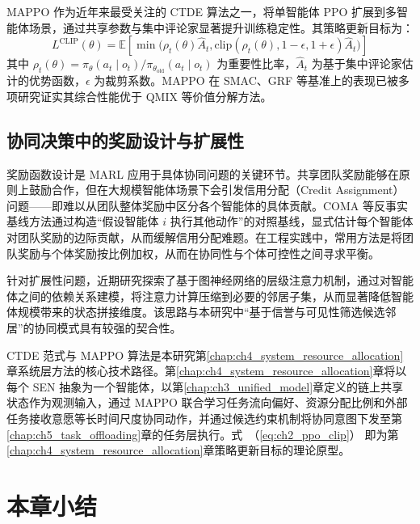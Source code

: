 MAPPO 作为近年来最受关注的 CTDE 算法之一，将单智能体 PPO 扩展到多智能体场景，通过共享参数与集中评论家显著提升训练稳定性。其策略更新目标为：
\begin{equation}
  L^{\mathrm{CLIP}}(\theta) = \mathbb{E}\!\left[
    \min\!\Big(\rho_t(\theta) \hat{A}_t,
    \mathrm{clip}(\rho_t(\theta), 1-\epsilon, 1+\epsilon) \hat{A}_t\Big)
    \right]
  \label{eq:ch2_ppo_clip}
\end{equation}
其中 $\rho_t(\theta) = \pi_\theta(a_t \mid o_t) / \pi_{\theta_{\mathrm{old}}}(a_t \mid o_t)$ 为重要性比率，$\hat{A}_t$ 为基于集中评论家估计的优势函数，$\epsilon$ 为裁剪系数。MAPPO 在 SMAC、GRF 等基准上的表现已被多项研究证实其综合性能优于 QMIX 等价值分解方法\cite{ref5}。

\subsection{协同决策中的奖励设计与扩展性}
\label{subsec:ch2_marl_reward}

奖励函数设计是 MARL 应用于具体协同问题的关键环节。共享团队奖励能够在原则上鼓励合作，但在大规模智能体场景下会引发信用分配（Credit Assignment）问题——即难以从团队整体奖励中区分各个智能体的具体贡献。COMA 等反事实基线方法通过构造“假设智能体 $i$ 执行其他动作”的对照基线，显式估计每个智能体对团队奖励的边际贡献，从而缓解信用分配难题\cite{ref11,Amato2024CTDE}。在工程实践中，常用方法是将团队奖励与个体奖励按比例加权，从而在协同性与个体可控性之间寻求平衡。

针对扩展性问题，近期研究探索了基于图神经网络的层级注意力机制\cite{Li2024MARL_GA}，通过对智能体之间的依赖关系建模，将注意力计算压缩到必要的邻居子集，从而显著降低智能体规模带来的状态拼接维度。该思路与本研究中“基于信誉与可见性筛选候选邻居”的协同模式具有较强的契合性。

CTDE 范式与 MAPPO 算法是本研究第\ref{chap:ch4_system_resource_allocation}章系统层方法的核心技术路径。第\ref{chap:ch4_system_resource_allocation}章将以每个 SEN 抽象为一个智能体，以第\ref{chap:ch3_unified_model}章定义的链上共享状态作为观测输入，通过 MAPPO 联合学习任务流向偏好、资源分配比例和外部任务接收意愿等长时间尺度协同动作，并通过候选约束机制将协同意图下发至第\ref{chap:ch5_task_offloading}章的任务层执行。式~（\ref{eq:ch2_ppo_clip}） 即为第\ref{chap:ch4_system_resource_allocation}章策略更新目标的理论原型。

\section{本章小结}
\label{sec:ch2_summary}

